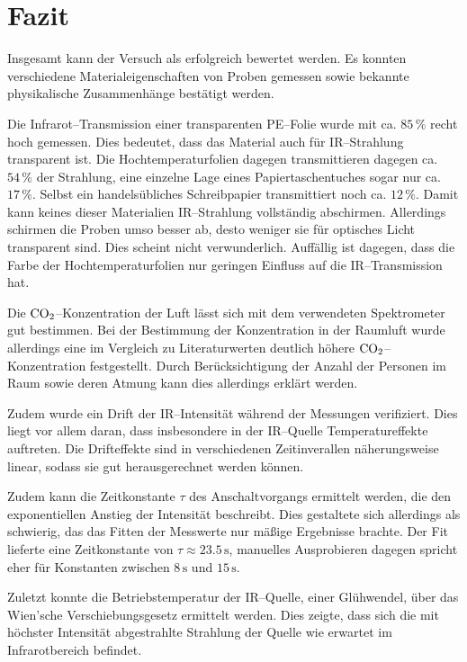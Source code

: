 \documentclass[12pt,a4paper]{scrartcl}
\numberwithin{equation}{section} %
\begin{document}
\clearpage
\hypertarget{fazit}{%
\section{Fazit}\label{fazit}}
Insgesamt kann der Versuch als erfolgreich bewertet werden. Es konnten verschiedene Materialeigenschaften von Proben gemessen sowie bekannte physikalische Zusammenhänge bestätigt werden.

Die Infrarot--Transmission einer transparenten PE--Folie wurde mit ca. $85\,\%$ recht hoch gemessen. Dies bedeutet, dass das Material auch für IR--Strahlung transparent ist. Die Hochtemperaturfolien dagegen transmittieren dagegen ca. $54\,\%$ der Strahlung, eine einzelne Lage eines Papiertaschentuches sogar nur ca. $17\,\%$. Selbst ein handelsübliches Schreibpapier transmittiert noch ca. $12\,\%$. Damit kann keines dieser Materialien IR--Strahlung vollständig abschirmen. Allerdings schirmen die Proben umso besser ab, desto weniger sie für optisches Licht transparent sind. Dies scheint nicht verwunderlich. Auffällig ist dagegen, dass die Farbe der Hochtemperaturfolien nur geringen Einfluss auf die IR--Transmission hat.

Die $\ce{CO_2}$--Konzentration der Luft lässt sich mit dem verwendeten Spektrometer gut bestimmen. Bei der Bestimmung der Konzentration in der Raumluft wurde allerdings eine im Vergleich zu Literaturwerten deutlich höhere $\ce{CO_2}$--Konzentration festgestellt. Durch Berücksichtigung der Anzahl der Personen im Raum sowie deren Atmung kann dies allerdings erklärt werden.

Zudem wurde ein Drift der IR--Intensität während der Messungen verifiziert. Dies liegt vor allem daran, dass insbesondere in der IR--Quelle Temperatureffekte auftreten. Die Drifteffekte sind in verschiedenen Zeitinverallen näherungsweise linear, sodass sie gut herausgerechnet werden können.

Zudem kann die Zeitkonstante $\tau$ des Anschaltvorgangs ermittelt werden, die den exponentiellen Anstieg der Intensität beschreibt. Dies gestaltete sich allerdings als schwierig, das das Fitten der Messwerte nur mäßige Ergebnisse brachte. Der Fit lieferte eine Zeitkonstante von $\tau\approx23.5\mathrm{\,s}$, manuelles Ausprobieren dagegen spricht eher für Konstanten zwischen $8\mathrm{\,s}$ und $15\mathrm{\,s}$.

Zuletzt konnte die Betriebstemperatur der IR--Quelle, einer Glühwendel, über das Wien'sche Verschiebungsgesetz ermittelt werden. Dies zeigte, dass sich die mit höchster Intensität abgestrahlte Strahlung der Quelle wie erwartet im Infrarotbereich befindet.
\end{document}
